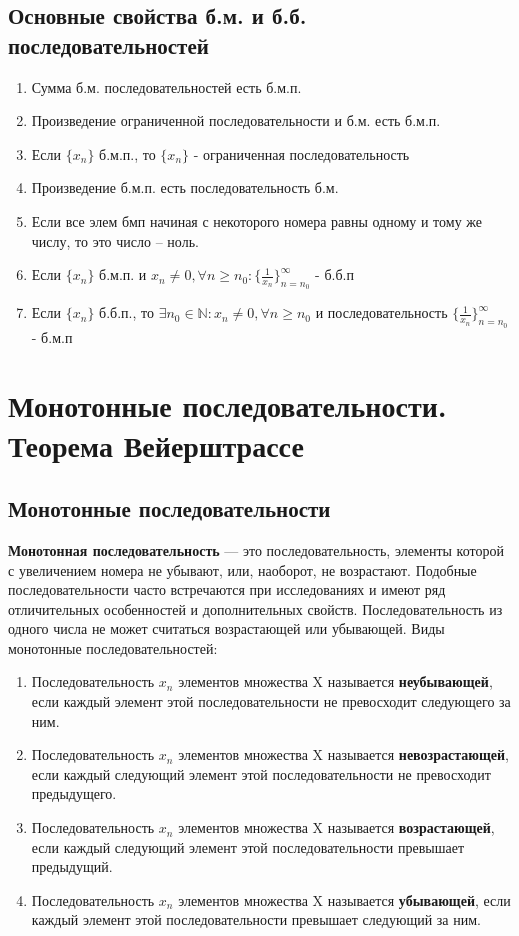 \documentclass[oneside]{book}
\begin{document}
\section{Основные свойства б.м. и б.б. последовательностей}
\begin{enumerate}
\item Сумма б.м. последовательностей есть б.м.п.
\item Произведение ограниченной последовательности и б.м. есть б.м.п.
\item Если $\{x_n\}$ б.м.п., то $\{x_n\}$ - ограниченная последовательность
\item Произведение б.м.п. есть последовательность б.м.
\item Если все элем бмп начиная с некоторого номера равны одному и тому же числу, то это число -- ноль. 
\item Если $\{x_n\}$ б.м.п. и $x_n \neq 0,  \forall n\geq n_0: \{\frac{1}{x_n}\}^\infty_{n=n_0}$ - б.б.п
\item Если $\{x_n\}$ б.б.п., то $\exists n_0 \in \mathbb{N}:x_n \neq 0,  \forall n\geq n_0$ и последовательность $ \{\frac{1}{x_n}\}^\infty_{n=n_0}$ - б.м.п
\end{enumerate}

\setcounter{chapter}{6}
\chapter{Монотонные последовательности. Теорема Вейерштрассе}
\section{Монотонные последовательности}
\textbf{Монотонная последовательность} — это последовательность, элементы которой с увеличением номера не убывают, или, наоборот, не возрастают. Подобные последовательности часто встречаются при исследованиях и имеют ряд отличительных особенностей и дополнительных свойств. Последовательность из одного числа не может считаться возрастающей или убывающей. 
Виды монотонные последовательностей:
\begin{enumerate}
  \item Последовательность ${x_{n}}$  элементов множества X называется \textbf{неубывающей}, если каждый элемент этой последовательности не превосходит следующего за ним.  
  \item Последовательность ${x_{n}}$  элементов множества X называется \textbf {невозрастающей}, если каждый следующий элемент этой последовательности не превосходит предыдущего.
  \item Последовательность ${x_{n}}$  элементов множества X называется \textbf{возрастающей}, если каждый следующий элемент этой последовательности превышает предыдущий. 
  \item Последовательность ${x_{n}}$  элементов множества X называется \textbf{убывающей}, если каждый элемент этой последовательности превышает следующий за ним.   
\end{enumerate}
\end{document}

